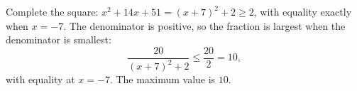 Complete the square: $x^2+14x+51=(x+7)^2+2\ge2$, with equality exactly when $x=-7$. The denominator is positive, so the fraction is largest when the denominator is smallest:
\[\dfrac{20}{(x+7)^2+2}\le\dfrac{20}{2}=10,\]
with equality at $x=-7$. The maximum value is $\boxed{10}$.
